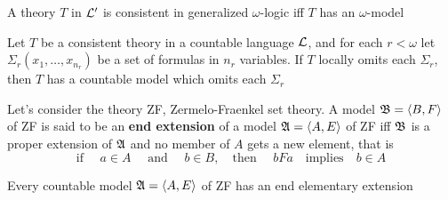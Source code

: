 \documentclass[11pt]{article}
\begin{document}
\begin{proposition}[]
A theory \(T\) in \(\mathcal{L}'\) is consistent in generalized \(\omega\)-logic
iff \(T\) has an \(\omega\)-model
\end{proposition}

\begin{theorem}
Let \(T\) be a consistent theory in a countable language \(\mathcal{L}\), and for
each \(r<\omega\) let \(\Sigma_r(x_1,\dots,x_{n_r})\) be a set of formulas in
\(n_r\) variables. If \(T\) locally omits each \(\Sigma_r\), then \(T\) has a
countable model which omits each \(\Sigma_r\)
\end{theorem}

Let's consider the theory ZF, Zermelo-Fraenkel set theory. A model \(\mathfrak{B}=\langle
   B,F\rangle\) of ZF is said to be an \textbf{end extension} of a model \(\mathfrak{A}=\langle A,E\rangle\)
of ZF iff \(\mathfrak{B}\) is a proper extension of \(\mathfrak{A}\) and no member of \(A\)
gets a new element, that is
\begin{equation*}
\text{if }\quad a\in A \quad\text{ and }\quad
b\in B,\quad\text{then }\quad bFa\quad\text{implies}\quad b\in A
\end{equation*}

\begin{theorem}[]
Every countable model \(\mathfrak{A}=\langle A,E\rangle\) of ZF has an end elementary extension
\end{theorem}
\end{document}
